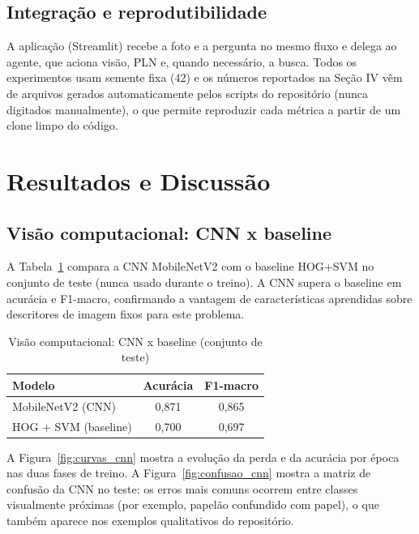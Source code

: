 \documentclass[conference]{IEEEtran}
\begin{document}
\subsection{Integração e reprodutibilidade}

A aplicação (Streamlit) recebe a foto e a pergunta no mesmo fluxo e delega ao agente, que
aciona visão, PLN e, quando necessário, a busca. Todos os experimentos usam semente fixa (42)
e os números reportados na Seção IV vêm de arquivos gerados automaticamente pelos scripts do
repositório (nunca digitados manualmente), o que permite reproduzir cada métrica a partir de
um clone limpo do código.

\section{Resultados e Discussão}

\subsection{Visão computacional: CNN x baseline}

A Tabela~\ref{tab:cnn_baseline} compara a CNN MobileNetV2 com o baseline HOG+SVM no conjunto
de teste (nunca usado durante o treino). A CNN supera o baseline em acurácia e F1-macro,
confirmando a vantagem de características aprendidas sobre descritores de imagem fixos para
este problema.

\begin{table}[htbp]
\caption{Visão computacional: CNN x baseline (conjunto de teste)}
\begin{center}
\begin{tabular}{lcc}
\hline
\textbf{Modelo} & \textbf{Acurácia} & \textbf{F1-macro} \\
\hline
MobileNetV2 (CNN) & 0,871 & 0,865 \\
HOG + SVM (baseline) & 0,700 & 0,697 \\
\hline
\end{tabular}
\label{tab:cnn_baseline}
\end{center}
\end{table}

A Figura~\ref{fig:curvas_cnn} mostra a evolução da perda e da acurácia por época nas duas
fases de treino. A Figura~\ref{fig:confusao_cnn} mostra a matriz de confusão da CNN no teste:
os erros mais comuns ocorrem entre classes visualmente próximas (por exemplo, papelão
confundido com papel), o que também aparece nos exemplos qualitativos do repositório.
\end{document}
